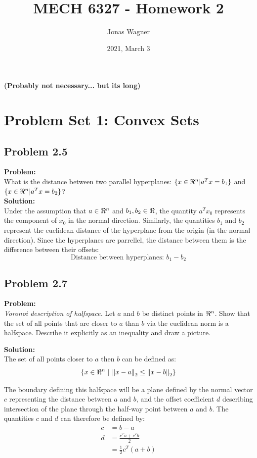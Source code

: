 \documentclass[letter]{article}
\title{MECH 6327 - Homework 2}
\author{Jonas Wagner}
\date{2021, March 3}
\begin{document}
\maketitle

\newpage
\textbf{(Probably not necessary... but its long)}
\tableofcontents

\newpage
\section{Problem Set 1: Convex Sets}

\subsection{Problem 2.5}
\textbf{Problem:}\\
What is the distance between two parallel hyperplanes: $\{x \in \real^n | a^T x = b_1\}$ and $\{x \in \real^n | a^T x = b_2\}$?\\

\noindent
\textbf{Solution:}\\
Under the assumption that $a\in \real^n$ and $b_1,b_2 \in \real$, the quantity $a^T x_0$ represents the component of $x_0$ in the normal direction. Similarly, the quantities $b_1$ and $b_2$ represent the euclidean distance of the hyperplane from the origin (in the normal direction). Since the hyperplanes are parrellel, the distance between them is the difference between their offsets:
\begin{equation}
	\text{Distance between hyperplanes: } b_1 - b_2
\end{equation}


\subsection{Problem 2.7}
\textbf{Problem:}\\
\textit{Voronoi description of halfspace.} Let $a$ and $b$ be distinct points in $\real^n$. Show that the set of all points that are closer to $a$ than $b$ via the euclidean norm is a halfspace. Describe it explicitly as an inequality and draw a picture.

\noindent
\textbf{Solution:}\\
The set of all points closer to $a$ then $b$ can be defined as:
\begin{equation}
	\{x \in \real^n \ | \ \norm{x-a}_2 \leq \norm{x-b}_2\}
\end{equation}

The boundary defining this halfspace will be a plane defined by the normal vector $c$ representing the distance between $a$ and $b$, and the offset coefficient $d$ describing intersection of the plane through the half-way point between $a$ and $b$. The quantities $c$ and $d$ can therefore be defined by:
\begin{equation}
	\begin{aligned}
		c &= b - a\\
		d &= \frac{c^T a + c^T b}{2}\\
		  &= \frac{1}{2} c^T (a+b)
	\end{aligned}
\end{equation}
\end{document}
